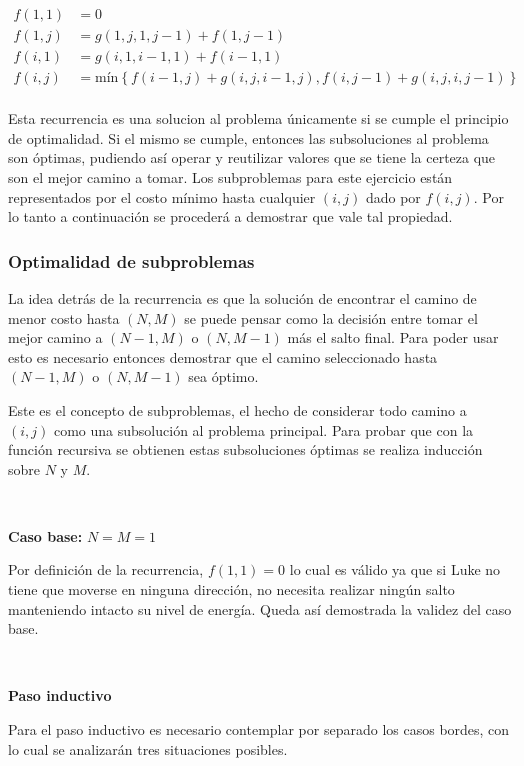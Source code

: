 	\begin{align*}
		f(1, 1) &= 0 \\
		f(1, j) &= g(1, j, 1, j - 1) + f(1, j - 1) \\
		f(i, 1) &= g(i, 1, i - 1, 1) + f(i - 1, 1) \\
		f(i, j) &= \text{mín}\left \{ f(i - 1, j) + g(i, j, i - 1, j), f(i, j - 1) + g(i, j, i, j - 1) \right \} \\
	\end{align*}

	Esta recurrencia es una solucion al problema únicamente si se cumple el principio
	de optimalidad. Si el mismo se cumple, entonces las subsoluciones al problema son
	óptimas, pudiendo así operar y reutilizar valores que se tiene la certeza
	que son el mejor camino a tomar. Los subproblemas para este ejercicio están
	representados por el costo mínimo hasta cualquier $(i, j)$ dado por $f(i,
	j)$. Por lo tanto a continuación se procederá a demostrar que vale tal
	propiedad.

	\subsubsection*{Optimalidad de subproblemas}

	La idea detrás de la recurrencia es que la solución de encontrar el camino
	de menor costo hasta $(N, M)$ se puede pensar como la decisión entre tomar
	el mejor camino a $(N - 1, M)$ o $(N, M - 1)$ más el salto final. Para poder
	usar esto es necesario entonces demostrar que el camino seleccionado hasta
	$(N - 1, M)$ o $(N, M - 1)$ sea óptimo.

	Este es el concepto de subproblemas, el hecho de considerar todo camino a
	$(i, j)$ como una subsolución al problema principal. Para probar que con la
	función recursiva se obtienen estas subsoluciones óptimas se realiza
	inducción sobre $N$ y $M$.

	~

	\textbf{Caso base: } $N = M = 1$

	Por definición de la recurrencia, $f(1, 1) = 0$ lo cual es válido ya que si
	Luke no tiene que moverse en ninguna dirección, no necesita realizar ningún
	salto manteniendo intacto su nivel de energía. Queda así demostrada la
	validez del caso base.

	~

	\textbf{Paso inductivo}

	Para el paso inductivo es necesario contemplar por separado los casos
	bordes, con lo cual se analizarán tres situaciones posibles.

